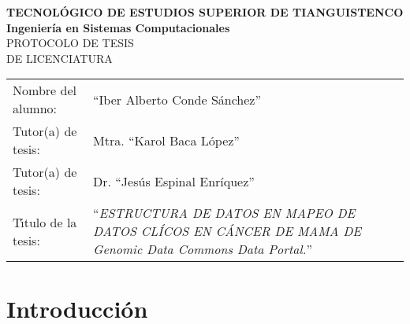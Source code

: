\documentclass[10pt,a4paper]{article}
\begin{document}
\begin{center} 

{\Large \textbf{TECNOL\'OGICO DE ESTUDIOS SUPERIOR DE TIANGUISTENCO}}\\
\vspace{1cm}
{\large \textbf{Ingenier\'ia en Sistemas Computacionales}}\\
\vspace{1cm}
PROTOCOLO DE TESIS\\
DE LICENCIATURA \vspace{2cm} \\
\begin{tabular}{p{4cm}p{8cm}}
Nombre del alumno: & ``Iber Alberto Conde S\'anchez''\\
Tutor(a) de tesis: & Mtra. ``Karol Baca L\'opez'' \\
Tutor(a) de tesis: & Dr. ``Jes\'us Espinal Enr\'iquez'' \\
T\'\i tulo de la tesis: &
``{\em ESTRUCTURA DE DATOS EN MAPEO DE DATOS CL\'ICOS EN C\'ANCER DE MAMA  DE Genomic Data Commons Data Portal.}'' \\
\end{tabular}
\end{center}

\begin{abstract}
El c\'ancer de mama es la neoplasia m\'as frecuente y con mayor tasa de mortalidad entre las mujeres en M\'exico. En este trabajo se revisan datos cl\'inicos p\'ublicos de C\'ancer de Mama del portal Genomic Data Commons (GDC) en el que es posible compartir informaci\'on sobre estudios gen\'omicos sobre el c\'ancer en apoyo de la medicina de precisi\'on. Esto consiste en una construcci\'on de una  aplicaci\'on para la presentaci\'on de datos cl\'inicos, bioespec\'ificos y pequeños vol\'umenes de datos moleculares, con herramientas espec\'ificas y seleccionadas para mayor uso de los formatos descargados del GDC como Gestor de Base de Datos (MongoDB) y lenguajes de programaci\'on como Java (NetBeans). Se hace la gesti\'on de Base de Datos para la conexi\'on con el lenguaje de programaci\'on y as\'i obtener nuestra propio Software para facilitar el uso de Datos al Investigador.

Key words: Mapeo de Datos Cl\'inicos, C\'ancer de Mama , GDC, MongoDB, Java.
\end{abstract}

\renewcommand{\contentsname}{\'Indice}
\tableofcontents
\newpage


\section{Introducción} 
\end{document}
